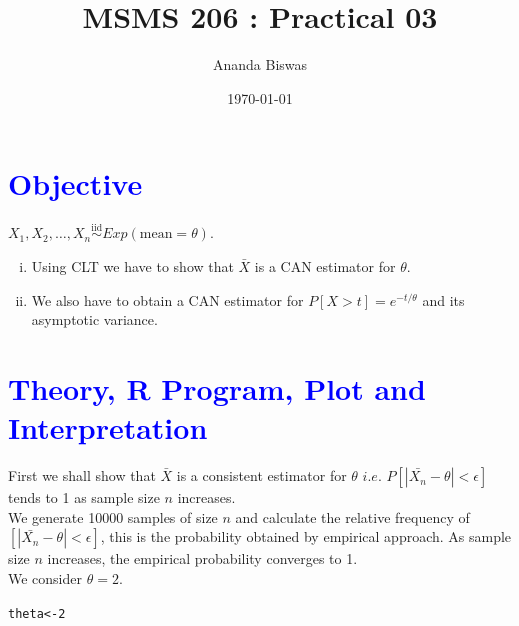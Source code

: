 \documentclass[11pt, a4paper]{article}\usepackage[]{graphicx}\usepackage[]{xcolor}
\title{MSMS 206 : Practical 03}
\author{Ananda Biswas}
\date{\today}
\makeatletter
\newcommand{\hlnum}[1]{\textcolor[rgb]{0.686,0.059,0.569}{#1}}%
\newcommand{\hldef}[1]{\textcolor[rgb]{0.345,0.345,0.345}{#1}}%
\newcommand{\hlkwb}[1]{\textcolor[rgb]{0.69,0.353,0.396}{#1}}%
\newenvironment{kframe}{%
 \def\at@end@of@kframe{}%
 \ifinner\ifhmode%
  \def\at@end@of@kframe{\end{minipage}}%
  \begin{minipage}{\columnwidth}%
 \fi\fi%
 \def\FrameCommand##1{\hskip\@totalleftmargin \hskip-\fboxsep
 \colorbox{shadecolor}{##1}\hskip-\fboxsep
     \hskip-\linewidth \hskip-\@totalleftmargin \hskip\columnwidth}%
 \MakeFramed {\advance\hsize-\width
   \@totalleftmargin\z@ \linewidth\hsize
   \@setminipage}}%
 {\par\unskip\endMakeFramed%
 \at@end@of@kframe}
\newenvironment{knitrout}{}{} %
\makeatother
\begin{document}
\maketitle


\section*{\faArrowAltCircleRight[regular] \textcolor{blue}{Objective}}

\hspace{1cm} $X_1, X_2, \ldots , X_{n} \overset{\text{iid}}{\sim} Exp(\text{mean} = \theta).$


\begin{enumerate}[(i)]
\item Using CLT we have to show that $\bar{X}$ is a CAN estimator for $\theta$.
\item We also have to obtain a CAN estimator for $P[X > t] = e^{-t / \theta}$ and its asymptotic variance.
\end{enumerate}



\section*{\faArrowAltCircleRight[regular] \textcolor{blue}{Theory, R Program, Plot and Interpretation}}

\leftpointright \hspace{0.5cm} First we shall show that $\bar{X}$ is a consistent estimator for $\theta$ $i.e.$ $P[|\bar{X_n} - \theta| < \epsilon]$ tends to 1 as sample size $n$ increases. \\

We generate 10000 samples of size $n$ and calculate the relative frequency of $[|\bar{X_n} - \theta| < \epsilon]$, this is the probability obtained by empirical approach. As sample size $n$ increases, the empirical probability converges to 1. \\

We consider $\theta = 2$.

\begin{knitrout}
\color{fgcolor}\begin{kframe}
\begin{alltt}
\hldef{theta} \hlkwb{<-} \hlnum{2}
\end{alltt}
\end{kframe}
\end{knitrout}
\end{document}
